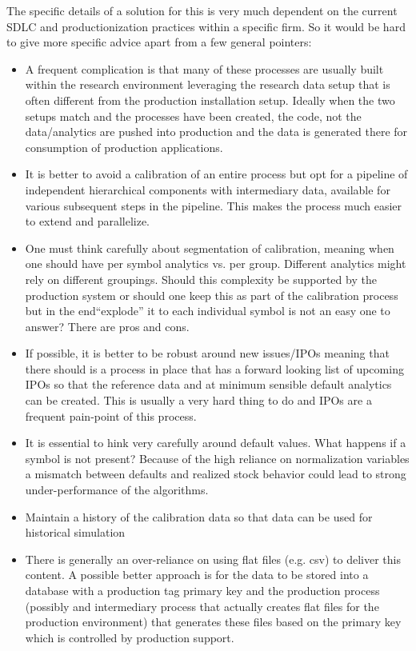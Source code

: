 The specific details of a solution for this is very much dependent on the current SDLC and productionization practices within a specific firm. So it would be hard to give more specific advice apart from a few general pointers:
\begin{itemize}
\item A frequent complication is that many of these processes are usually built within the research environment leveraging the research data setup that is often different from the production installation setup. Ideally when the two setups match and the processes have been created, the code, not the data/analytics are pushed into production and the data is generated there for consumption of production applications.
\item It is better to avoid a calibration of an entire process but opt for a pipeline of independent hierarchical components with intermediary data, available for various subsequent steps in the pipeline. This makes the process much easier to extend and parallelize. 
\item One must think carefully about segmentation of calibration, meaning when one should have per symbol analytics vs. per group. Different analytics might rely on different groupings. Should this complexity be supported by the production system or should one keep this as part of the calibration process but in the end``explode'' it to each individual symbol is not an easy one to answer? There are pros and cons.
\item If possible, it is better to be robust around new issues/IPOs meaning that there should is a process in place that has a forward looking list of upcoming IPOs so that the reference data and at minimum sensible default analytics can be created. This is usually a very hard thing to do and IPOs are a frequent pain-point of this process.
\item It is essential to hink very carefully around default values. What happens if a symbol is not present? Because of the high reliance on normalization variables a mismatch between defaults and realized stock behavior could lead to strong under-performance of the algorithms.
\item Maintain a history of the calibration data so that data can be used for historical simulation
\item There is generally an over-reliance on using flat files (e.g. csv) to deliver this content. A possible better approach is for the data to be stored into a database with a production tag primary key and the production process (possibly and intermediary process that actually creates flat files for the production environment) that generates these files based on the primary key which is controlled by production support. 
\end{itemize}



